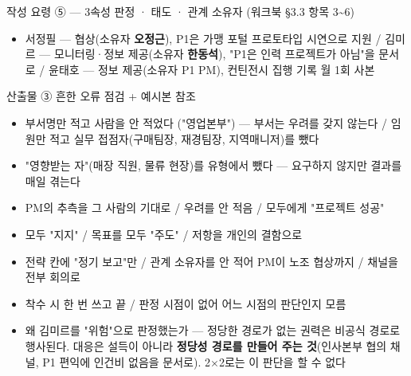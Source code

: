 \begin{frame}[allowframebreaks=1.0]{작성 요령 ⑤ — 3속성 판정 · 태도 · 관계 소유자 (워크북 §3.3 항목 3\textasciitilde{}6)}
\begin{itemize}
\item\relax 서정필 — 협상(소유자 \textbf{오정근}), P1은 가맹 포털 프로토타입 시연으로 지원 / 김미르 — 모니터링·정보 제공(소유자 \textbf{한동석}), "P1은 인력 프로젝트가 아님"을 문서로 / 윤태호 — 정보 제공(소유자 P1 PM), 컨틴전시 집행 기록 월 1회 사본
\end{itemize}
\end{frame}

\begin{frame}[allowframebreaks=1.0]{산출물 ③ 흔한 오류 점검 + 예시본 참조}
\small
\par\smallskip{}\nobreak
\begin{itemize}
\item[$\square$]\relax 부서명만 적고 사람을 안 적었다 ("영업본부") — 부서는 우려를 갖지 않는다 / 임원만 적고 실무 접점자(구매팀장, 재경팀장, 지역매니저)를 뺐다
\item[$\square$]\relax "영향받는 자"(매장 직원, 물류 현장)를 유형에서 뺐다 — 요구하지 않지만 결과를 매일 겪는다
\item[$\square$]\relax PM의 추측을 그 사람의 기대로 / 우려를 안 적음 / 모두에게 "프로젝트 성공"
\item[$\square$]\relax 모두 "지지" / 목표를 모두 "주도" / 저항을 개인의 결함으로
\item[$\square$]\relax 전략 칸에 "정기 보고"만 / 관계 소유자를 안 적어 PM이 노조 협상까지 / 채널을 전부 회의로
\item[$\square$]\relax 착수 시 한 번 쓰고 끝 / 판정 시점이 없어 어느 시점의 판단인지 모름
\end{itemize}
\par\smallskip{}\nobreak
\begin{itemize}
\item\relax 왜 김미르를 "위험"으로 판정했는가 — 정당한 경로가 없는 권력은 비공식 경로로 행사된다. 대응은 설득이 아니라 \textbf{정당성 경로를 만들어 주는 것}(인사본부 협의 채널, P1 편익에 인건비 없음을 문서로). 2$\times$2로는 이 판단을 할 수 없다

\end{itemize}
\end{frame}
